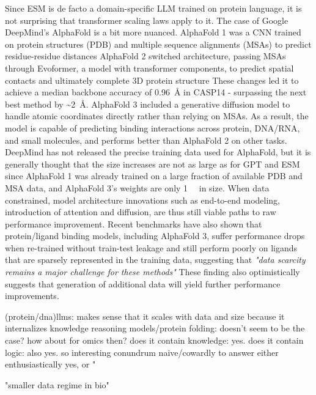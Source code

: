 Since ESM is de facto a domain-specific LLM trained on protein language, it is not surprising that transformer scaling laws apply to it. The case of Google DeepMind's AlphaFold is a bit more nuanced. AlphaFold 1 was a CNN trained on protein structures (PDB) and multiple sequence alignments (MSAs) to predict residue-residue distances AlphaFold 2 switched architecture, passing MSAs through Evoformer, a model with transformer components, to predict spatial contacts and ultimately complete 3D protein structure These changes led it to achieve a median backbone accuracy of \SI{0.96}{\angstrom} in CASP14 - surpassing the next best method by \textasciitilde\SI{2}{\angstrom}. AlphaFold 3 included a generative diffusion model to handle atomic coordinates directly rather than relying on MSAs. As a result, the model is capable of predicting binding interactions across protein, DNA/RNA, and small molecules, and performs better than AlphaFold 2 on other tasks. DeepMind has not released the precise training data used for AlphaFold, but it is generally thought that the size increases are not as large as for GPT and ESM since AlphaFold 1 was already trained on a large fraction of available PDB and MSA data, and AlphaFold 3's weights are only \SI{1}{\giga\byte} in size. When data constrained, model architecture innovations such as end-to-end modeling, introduction of attention and diffusion, are thus still viable paths to raw performance improvement. Recent benchmarks have also shown that protein/ligand binding models, including AlphaFold 3, suffer performance drops when re-trained without train-test leakage and still perform poorly on ligands that are sparsely represented in the training data, suggesting that \textit{"data scarcity remains a major challenge for these methods"} These finding also optimistically suggests that generation of additional data will yield further performance improvements.

(protein/dna)llms: makes sense that it scales with data and size because it internalizes knowledge
reasoning models/protein folding: doesn't seem to be the case?
how about for omics then? does it contain knowledge: yes. does it contain logic: also yes.
so interesting conundrum
naive/cowardly to answer either enthusiastically yes, or "

"smaller data regime in bio"


